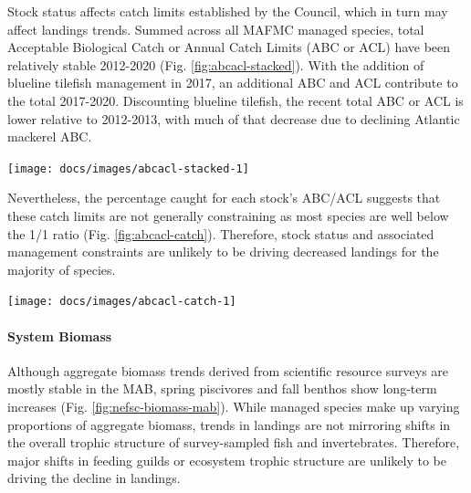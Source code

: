 \documentclass[
  10pt,
]{article}
\let\origfigure\figure
\let\endorigfigure\endfigure
\renewenvironment{figure}[1][2] {
    \expandafter\origfigure\expandafter[H]
} {
    \endorigfigure
}
\begin{document}
Stock status affects catch limits established by the Council, which in
turn may affect landings trends. Summed across all MAFMC managed
species, total Acceptable Biological Catch or Annual Catch Limits (ABC
or ACL) have been relatively stable 2012-2020 (Fig.
\ref{fig:abcacl-stacked}). With the addition of blueline tilefish
management in 2017, an additional ABC and ACL contribute to the total
2017-2020. Discounting blueline tilefish, the recent total ABC or ACL is
lower relative to 2012-2013, with much of that decrease due to declining
Atlantic mackerel ABC.

\begin{figure}

{\centering \texttt{[image: docs/images/abcacl-stacked-1]} 

}

\caption{Sum of catch limits across all MAFMC managed fisheries.}\label{fig:abcacl-stacked}
\end{figure}

Nevertheless, the percentage caught for each stock's ABC/ACL suggests
that these catch limits are not generally constraining as most species
are well below the 1/1 ratio (Fig. \ref{fig:abcacl-catch}). Therefore,
stock status and associated management constraints are unlikely to be
driving decreased landings for the majority of species.

\begin{figure}

{\centering \texttt{[image: docs/images/abcacl-catch-1]} 

}

\caption{Catch divided by ABC/ACL for MAFMC managed fisheies. Chub mackerel removed due extremely low catch. Outliers = Recreational Black Sea Bass.}\label{fig:abcacl-catch}
\end{figure}

\hypertarget{system-biomass}{%
\paragraph{System Biomass}\label{system-biomass}}

Although aggregate biomass trends derived from scientific resource
surveys are mostly stable in the MAB, spring piscivores and fall benthos
show long-term increases (Fig. \ref{fig:nefsc-biomass-mab}). While
managed species make up varying proportions of aggregate biomass, trends
in landings are not mirroring shifts in the overall trophic structure of
survey-sampled fish and invertebrates. Therefore, major shifts in
feeding guilds or ecosystem trophic structure are unlikely to be driving
the decline in landings.
\end{document}
